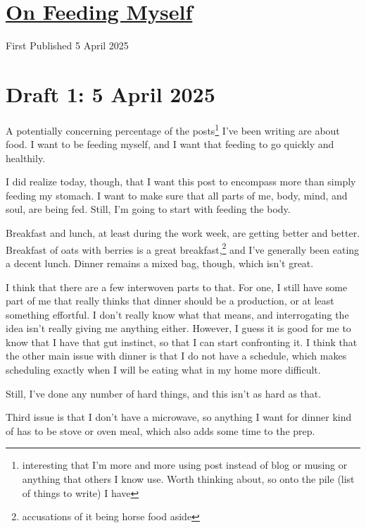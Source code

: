\documentclass[12pt]{article}[titlepage]
\renewcommand{\,}{\textsuperscript{,}}
\begin{document}
\doublespacing
\section{\href{feeding-myself.html}{On Feeding Myself}}
First Published 5 April 2025
\section{Draft 1: 5 April 2025}

A potentially concerning percentage of the posts\footnote{interesting that I'm more and more using post instead of blog or musing or anything that others I know use. Worth thinking about, so onto the pile (list of things to write) I have} I've been writing are about food.  
I want to be feeding myself, and I want that feeding to go quickly and healthily.

I did realize today, though, that I want this post to encompass more than simply feeding my stomach.  
I want to make sure that all parts of me, body, mind, and soul, are being fed.  
Still, I'm going to start with feeding the body.

Breakfast and lunch, at least during the work week, are getting better and better.  
Breakfast of oats with berries is a great breakfast,\footnote{accusations of it being horse food aside} and I've generally been eating a decent lunch.  
Dinner remains a mixed bag, though, which isn't great.

I think that there are a few interwoven parts to that.  
For one, I still have some part of me that really thinks that dinner should be a production, or at least something effortful.  
I don't really know what that means, and interrogating the idea isn't really giving me anything either.  
However, I guess it is good for me to know that I have that gut instinct, so that I can start confronting it.  
I think that the other main issue with dinner is that I do not have a schedule, which makes scheduling exactly when I will be eating what in my home more difficult.

Still, I've done any number of hard things, and this isn't as hard as that.

Third issue is that I don't have a microwave, so anything I want for dinner kind of has to be stove or oven meal, which also adds some time to the prep.
\end{document}
